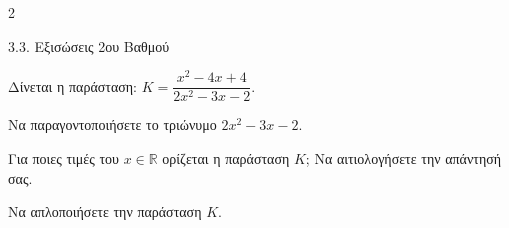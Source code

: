 \begin{ylh}{2}
    \item 3.3. Εξισώσεις 2ου Βαθμού
\end{ylh}
Δίνεται η παράσταση: ${K} = \dfrac{x^2 - 4x + 4}{2x^2 - 3x - 2}$.
\begin{alist}
\item Να παραγοντοποιήσετε το τριώνυμο $2x^2 - 3x - 2$.
\item Για ποιες τιμές του $x \in \mathbb{R}$ ορίζεται η παράσταση ${K}$; Να αιτιολογήσετε την απάντησή σας.
\item Να απλοποιήσετε την παράσταση ${K}$.
\end{alist}

